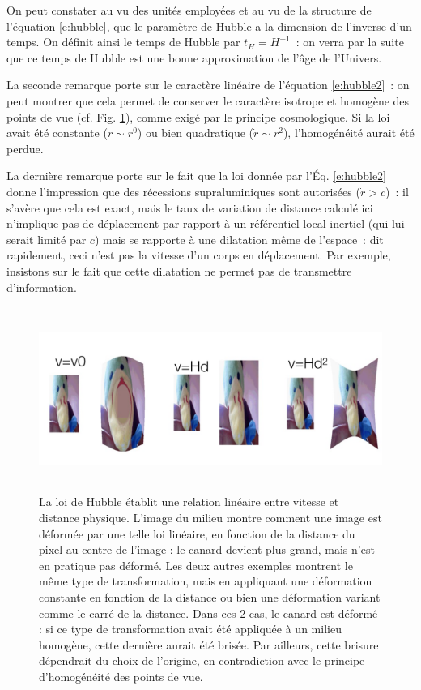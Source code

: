 On peut constater au vu des unités employées et au vu de la structure de l'équation \ref{e:hubble}, que le paramètre de Hubble a la dimension de l'inverse d'un temps. On définit ainsi le temps de Hubble par $t_H=H^{-1}$~: on verra par la suite que ce temps de Hubble est une bonne approximation de l'âge de l'Univers. 

La seconde remarque porte sur le caractère linéaire de l'équation \ref{e:hubble2}~: on peut montrer que cela permet de conserver le caractère isotrope et homogène des points de vue (cf. Fig. \ref{f:canard}), comme exigé par le principe cosmologique. Si la loi avait été constante ($\dot r \sim r^0$) ou bien quadratique ($\dot r\sim r^2$), l'homogénéité aurait été perdue. 

La dernière remarque porte sur le fait que la loi donnée par l'Éq. \ref{e:hubble2} donne l'impression que des récessions supraluminiques sont autorisées ($\dot r>c$)~: il s'avère que cela est exact, mais le taux de variation de distance calculé ici n'implique pas de déplacement par rapport à un référentiel local inertiel (qui lui serait limité par $c$) mais se rapporte à une dilatation  même de l'espace~: dit rapidement, ceci n'est pas la vitesse d'un corps en déplacement. Par exemple, insistons sur le fait que cette dilatation ne permet pas de transmettre d'information.

\begin{figure}[htbp]
	\centering
		\includegraphics[height=6cm]{figs/canard.png}
	\caption[loi de Hubble et homogénéité]{La loi de Hubble établit une relation linéaire entre vitesse et distance physique. L'image du milieu montre comment une image est déformée par une telle loi linéaire, en fonction de la distance du pixel au centre de l'image : le canard devient plus grand, mais n'est en pratique pas déformé. Les deux autres exemples montrent le même type de transformation, mais en appliquant une déformation constante en fonction de la distance ou bien une déformation variant comme le carré de la distance. Dans ces 2 cas, le canard est déformé : si ce type de transformation avait été appliquée à un milieu homogène, cette dernière aurait été brisée. Par ailleurs, cette brisure dépendrait du choix de l'origine, en contradiction avec le principe d'homogénéité des points de vue.}
	\label{f:canard}
\end{figure}

